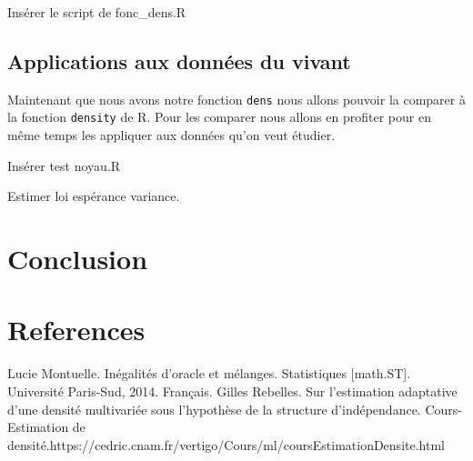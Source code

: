\documentclass[
]{book}
\begin{document}
Insérer le script de fonc\_dens.R

\hypertarget{applications-aux-donnuxe9es-du-vivant}{%
\section{Applications aux données du vivant}\label{applications-aux-donnuxe9es-du-vivant}}

Maintenant que nous avons notre fonction \texttt{dens} nous allons pouvoir la comparer à la fonction \texttt{density} de R. Pour les comparer nous allons en profiter pour en même temps les appliquer aux données qu'on veut étudier.

Insérer test noyau.R

Estimer loi espérance variance.

\hypertarget{conclusion}{%
\chapter{Conclusion}\label{conclusion}}

\hypertarget{references}{%
\chapter{References}\label{references}}

\label{eq:oracle} Lucie Montuelle. Inégalités d'oracle et mélanges. Statistiques {[}math.ST{]}. Université Paris-Sud, 2014.
Français.\newline
\label{eq:est-ad} Gilles Rebelles. Sur l'estimation adaptative d'une densité multivariée sous l'hypothèse de la structure d'indépendance.\newline
\label{eq:cours-est} Cours-Estimation de densité.https://cedric.cnam.fr/vertigo/Cours/ml/coursEstimationDensite.html\newline

  
\end{document}
